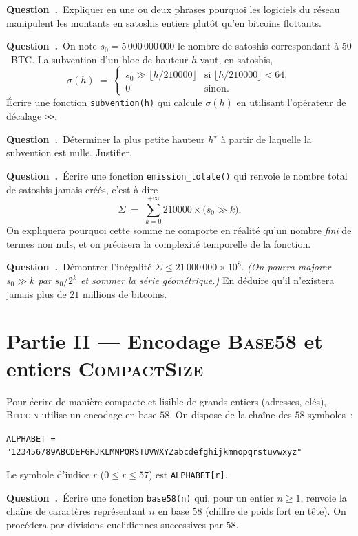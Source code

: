 \documentclass[11pt,a4paper]{article}
\newcounter{qcnt}
\newcommand{\Q}{\medskip\par\stepcounter{qcnt}\noindent\textbf{Question~\theqcnt.}~}
\newcommand{\code}[1]{\lstinline!#1!}
\begin{document}
\Q Expliquer en une ou deux phrases pourquoi les logiciels du réseau manipulent les montants en satoshis entiers plutôt qu'en bitcoins flottants.

\Q On note $s_0 = 5\,000\,000\,000$ le nombre de satoshis correspondant à $50$~\textsc{BTC}. La subvention d'un bloc de hauteur $h$ vaut, en satoshis,
\[
  \sigma(h) \;=\;
  \begin{cases}
    s_0 \gg \big\lfloor h/210000\big\rfloor & \text{si } \big\lfloor h/210000\big\rfloor < 64,\\[4pt]
    0 & \text{sinon.}
  \end{cases}
\]
Écrire une fonction \code{subvention(h)} qui calcule $\sigma(h)$ en utilisant l'opérateur de décalage \code{>>}.

\Q Déterminer la plus petite hauteur $h^\star$ à partir de laquelle la subvention est nulle. Justifier.

\Q Écrire une fonction \code{emission_totale()} qui renvoie le nombre total de satoshis jamais créés, c'est-à-dire
\[
  \Sigma \;=\; \sum_{k=0}^{+\infty} 210000 \times \big(s_0 \gg k\big).
\]
On expliquera pourquoi cette somme ne comporte en réalité qu'un nombre \emph{fini} de termes non nuls, et on précisera la complexité temporelle de la fonction.

\Q Démontrer l'inégalité $\Sigma \le 21\,000\,000 \times 10^{8}$. \emph{(On pourra majorer $s_0\gg k$ par $s_0/2^k$ et sommer la série géométrique.)} En déduire qu'il n'existera jamais plus de $21$ millions de bitcoins.

\section*{Partie II --- Encodage \textsc{Base58} et entiers \textsc{CompactSize}}

Pour écrire de manière compacte et lisible de grands entiers (adresses, clés), \textsc{Bitcoin} utilise un encodage en base $58$. On dispose de la chaîne des $58$ symboles~:
\begin{center}
\code{ALPHABET = "123456789ABCDEFGHJKLMNPQRSTUVWXYZabcdefghijkmnopqrstuvwxyz"}
\end{center}
Le symbole d'indice $r$ ($0\le r\le 57$) est \code{ALPHABET[r]}.

\Q Écrire une fonction \code{base58(n)} qui, pour un entier $n\ge 1$, renvoie la chaîne de caractères représentant $n$ en base $58$ (chiffre de poids fort en tête). On procédera par divisions euclidiennes successives par $58$.
\end{document}
